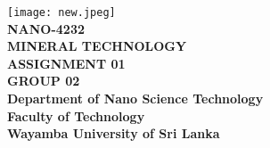 \documentclass[12pt,a4paper, top=1.9cm, bottom=2.03cm, left=3.81cm, right=1.9cm]{article}
\begin{document}
\begin{titlepage}

    \begin{center}
        \vspace*{1cm}
        \texttt{[image: new.jpeg]}\\[2cm]
        
       \textbf{\LARGE NANO-4232}\\[0.5cm]
        \textbf{\Large MINERAL TECHNOLOGY}\\[1CM]
        \textbf{\Large ASSIGNMENT 01}\\[0.3cm]
        \textbf{\Large GROUP 02}\\[8cm]
        \textbf{\Large Department of Nano Science Technology}\\
        \textbf{\Large Faculty of Technology}\\
        \textbf{\Large Wayamba University of Sri Lanka}\\
        
    \end{center}
\end{titlepage}

\clearpage
{}

\setcounter{tocdepth}{3}
\tableofcontents
\clearpage
\listoffigures    %
\newpage
\listoftables     %
\newpage
\end{document}

